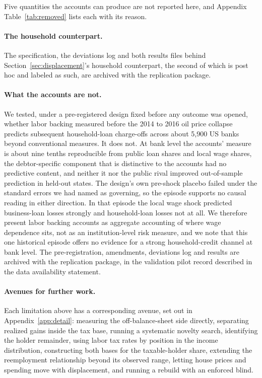 Five quantities the accounts can produce are not reported here, and Appendix
Table~\ref{tab:removed} lists each with its reason.

\paragraph{The household counterpart.} The specification, the deviations log and both
results files behind Section~\ref{sec:displacement}'s household counterpart, the second of
which is post hoc and labeled as such, are archived with the replication package.

\paragraph{What the accounts are not.} We tested, under a pre-registered design fixed before
any outcome was opened, whether labor backing measured before the 2014 to 2016 oil price collapse
predicts subsequent household-loan charge-offs across about 5,900 US banks beyond conventional
measures. It does not. At bank level the accounts' measure is about nine tenths reproducible from
public loan shares and local wage shares, the debtor-specific component that is distinctive to the
accounts had no predictive content, and neither it nor the public rival improved out-of-sample
prediction in held-out states. The design's own pre-shock placebo failed under the standard errors
we had named as governing, so the episode supports no causal reading in either direction. In that
episode the local wage shock predicted business-loan losses strongly and household-loan losses not
at all. We therefore present labor backing accounts as aggregate accounting of where wage
dependence sits, not as an institution-level risk measure, and we note that this one historical
episode offers no evidence for a strong household-credit channel at bank level. The
pre-registration, amendments, deviations log and results are archived with the replication
package, in the validation pilot record described in the data availability statement.

\paragraph{Avenues for further work.} Each limitation above has a corresponding avenue, set out in Appendix~\ref{app:detail}: measuring the off-balance-sheet side directly, separating realized gains inside the tax base, running a systematic novelty search, identifying the holder remainder, using labor tax rates by position in the income distribution, constructing both bases for the taxable-holder share, extending the reemployment relationship beyond its observed range, letting house prices and spending move with displacement, and running a rebuild with an enforced blind.
